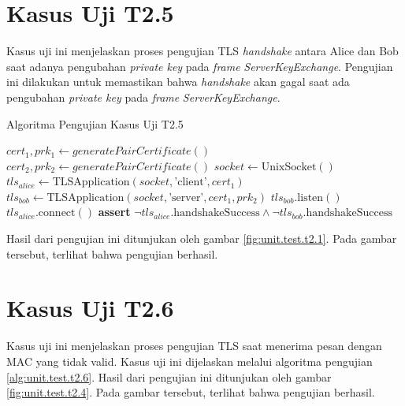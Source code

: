 \section{Kasus Uji T2.5}

Kasus uji ini menjelaskan proses pengujian TLS \emph{handshake} antara Alice dan Bob saat adanya pengubahan \emph{private key} pada \emph{frame} \emph{ServerKeyExchange}. Pengujian ini dilakukan untuk memastikan bahwa \emph{handshake} akan gagal saat ada pengubahan \emph{private key} pada \emph{frame} \emph{ServerKeyExchange}.

\begin{algorithm}
  \caption{Algoritma Pengujian Kasus Uji T2.5}
  \label{alg:unit.test.t2.5}
  \begin{algorithmic}
    \State $cert_1, prk_1 \gets generatePairCertificate()$
    \State $cert_2, prk_2 \gets generatePairCertificate()$
    \State $socket \gets \text{UnixSocket}()$
    \State $tls_{alice} \gets \text{TLSApplication}(socket, \text{'client'}, cert_1)$ 
    \State $tls_{bob} \gets \text{TLSApplication}(socket, \text{'server'}, cert_1, prk_2)$
    \State
    \State $tls_{bob}.\text{listen}()$  
    \State $tls_{alice}.\text{connect}()$  
    \State
    \State
    \State \textbf{assert} $\lnot tls_{alice}.\text{handshakeSuccess} \land \lnot tls_{bob}.\text{handshakeSuccess}$
  \end{algorithmic}
\end{algorithm}

Hasil dari pengujian ini ditunjukan oleh gambar \ref{fig:unit.test.t2.1}. Pada gambar tersebut, terlihat bahwa pengujian berhasil.

\section{Kasus Uji T2.6}

Kasus uji ini menjelaskan proses pengujian TLS saat menerima pesan dengan MAC yang tidak valid. Kasus uji ini dijelaskan melalui algoritma pengujian \ref{alg:unit.test.t2.6}. Hasil dari pengujian ini ditunjukan oleh gambar \ref{fig:unit.test.t2.4}. Pada gambar tersebut, terlihat bahwa pengujian berhasil.

